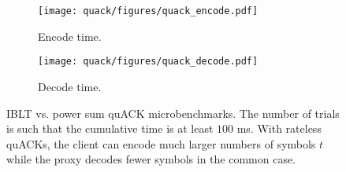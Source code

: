 \begin{figure}[t]
    \centering
    \begin{subfigure}[b]{0.49\linewidth}
        \centering
        \texttt{[image: quack/figures/quack\_encode.pdf]}
        \caption{Encode time.}
        \label{fig:quack:encode}
    \end{subfigure}
    \begin{subfigure}[b]{0.49\linewidth}
        \centering
        \texttt{[image: quack/figures/quack\_decode.pdf]}
        \caption{Decode time.}
        \label{fig:quack:decode}
    \end{subfigure}
    \caption{IBLT vs. power sum quACK microbenchmarks. The number of trials is
     such that the cumulative time is at least $100$ ms. With rateless quACKs,
     the client can encode much larger numbers of symbols $t$ while the proxy
     decodes fewer symbols in the common case.
     }
    \label{fig:quack}
\end{figure}